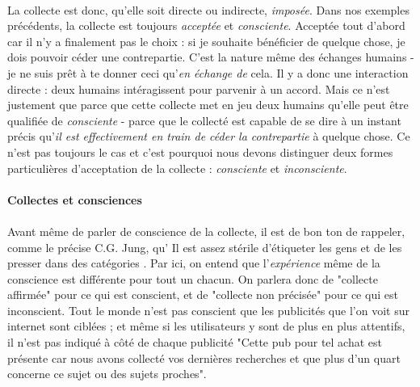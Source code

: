 \paragraph{} La collecte est donc, qu'elle soit directe ou indirecte, \emph{imposée}. Dans nos exemples précédents,
la collecte est toujours \emph{acceptée} et \emph{consciente}. Acceptée tout d'abord car il n'y a finalement pas le
choix : si je souhaite bénéficier de quelque chose, je dois pouvoir céder une contrepartie. C'est la nature même des
échanges humains - je ne suis prêt à te donner ceci qu'\emph{en échange de} cela. Il y a donc une interaction directe 
: deux humains intéragissent pour parvenir à un accord. Mais ce n'est justement que parce que cette collecte met en
jeu deux humains qu'elle peut être qualifiée de \emph{consciente} - parce que le collecté est capable de se dire à
un instant précis qu'\emph{il est effectivement en train de céder la contrepartie} à quelque chose. Ce n'est pas
toujours le cas et c'est pourquoi nous devons distinguer deux formes particulières d'acceptation de la collecte :
\emph{consciente} et \emph{inconsciente}.   

\paragraph{Collectes et consciences} \label{collect_data_conscious}

\paragraph{} Avant même de parler de conscience de la collecte, il est de bon ton de rappeler,
comme le précise C.G. Jung, qu' \guillemotleft Il est assez stérile d'étiqueter les gens et de les presser dans
des catégories \guillemotright. Par ici, on entend que l'\emph{expérience} même de la conscience est différente
pour tout un chacun. On parlera donc de "collecte affirmée" pour ce qui est conscient, et de "collecte non précisée"
pour ce qui est inconscient. Tout le monde n'est pas conscient que les publicités que l'on voit sur internet sont
ciblées ; et même si les utilisateurs y sont de plus en plus attentifs, il n'est pas indiqué à côté de chaque
publicité "Cette pub pour tel achat est présente car nous avons collecté vos dernières recherches et que plus d'un
quart concerne ce sujet ou des sujets proches". 

